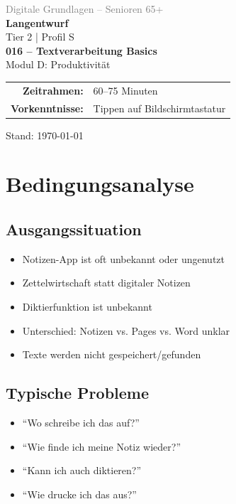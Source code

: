 \documentclass[11pt,a4paper]{article}
\begin{document}
\begin{titlepage}
    \centering
    \vspace*{2cm}
    {\Large\textcolor{gray}{Digitale Grundlagen -- Senioren 65+}}\\[2cm]
    {\Huge\textcolor{fach}{\textbf{Langentwurf}}}\\[0.5cm]
    {\large Tier 2 | Profil S}\\[2cm]
    {\LARGE\textbf{016 -- Textverarbeitung Basics}}\\[0.5cm]
    {\large Modul D: Produktivität}\\[2cm]
    \begin{tabular}{rl}
        \textbf{Zeitrahmen:} & 60--75 Minuten \\
        \textbf{Vorkenntnisse:} & Tippen auf Bildschirmtastatur \\
    \end{tabular}
    \vfill
    {\normalsize Stand: \today}
\end{titlepage}

\tableofcontents
\newpage

\section{Bedingungsanalyse}

\subsection{Ausgangssituation}
\begin{itemize}
    \item Notizen-App ist oft unbekannt oder ungenutzt
    \item Zettelwirtschaft statt digitaler Notizen
    \item Diktierfunktion ist unbekannt
    \item Unterschied: Notizen vs. Pages vs. Word unklar
    \item Texte werden nicht gespeichert/gefunden
\end{itemize}

\subsection{Typische Probleme}
\begin{itemize}
    \item ``Wo schreibe ich das auf?''
    \item ``Wie finde ich meine Notiz wieder?''
    \item ``Kann ich auch diktieren?''
    \item ``Wie drucke ich das aus?''
\end{itemize}
\end{document}
